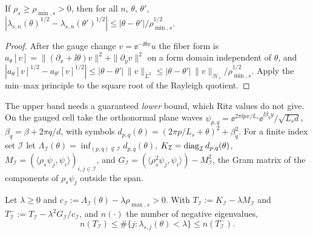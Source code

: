 \begin{lemma}\label{lem:lipschitz}
If $\rho_s\ge\rho_{\min,s}>0$, then for all $n$, $\theta$, $\theta'$,
$|\lambda_{s,n}(\theta)^{1/2}-\lambda_{s,n}(\theta')^{1/2}|
\le|\theta-\theta'|/\rho_{\min,s}^{1/2}$.
\end{lemma}

\begin{proof}
After the gauge change $v=\ee^{-\ii\theta x}u$ the fiber form is
$a_\theta[v]=\|(\partial_x+\ii\theta)v\|^2+\|\partial_yv\|^2$ on a form domain
independent of $\theta$, and $|a_\theta[v]^{1/2}-a_{\theta'}[v]^{1/2}|\le
|\theta-\theta'|\,\|v\|_{L^2}\le|\theta-\theta'|\,\|v\|_{\mathcal H_s}/
\rho_{\min,s}^{1/2}$. Apply the min--max principle to the square root of the
Rayleigh quotient.
\end{proof}

The upper band needs a guaranteed \emph{lower} bound, which Ritz values do not
give. On the gauged cell take the orthonormal plane waves
$\psi_{p,q}=\ee^{2\pi\ii px/L_s}\ee^{\ii\beta_qy}/\sqrt{L_sd}$,
$\beta_q=\beta+2\pi q/d$, with symbols
$d_{p,q}(\theta)=(2\pi p/L_s+\theta)^2+\beta_q^2$. For a finite index set
$\mathcal I$ let $\Lambda_{\mathcal I}(\theta)=\inf_{(p,q)\notin\mathcal I}
d_{p,q}(\theta)$, $K_{\mathcal I}=\operatorname{diag}_{\mathcal I}d_{p,q}(\theta)$,
$M_{\mathcal I}=(\langle\rho_s\psi_j,\psi_i\rangle)_{i,j\in\mathcal I}$, and
$G_{\mathcal I}=(\langle\rho_s^2\psi_j,\psi_i\rangle)-M_{\mathcal I}^2$, the Gram
matrix of the components of $\rho_s\psi_j$ outside the span.

\begin{theorem}\label{thm:complement}
Let $\lambda\ge0$ and $c_{\mathcal I}:=\Lambda_{\mathcal I}(\theta)-
\lambda\rho_{\max,s}>0$. With $T_{\mathcal I}:=K_{\mathcal I}-\lambda M_{\mathcal I}$
and $T^-_{\mathcal I}:=T_{\mathcal I}-\lambda^2G_{\mathcal I}/c_{\mathcal I}$, and
$n(\cdot)$ the number of negative eigenvalues,
\[
  n(T_{\mathcal I})\le\#\{j:\lambda_{s,j}(\theta)<\lambda\}\le n(T^-_{\mathcal I}).
\]
\end{theorem}


